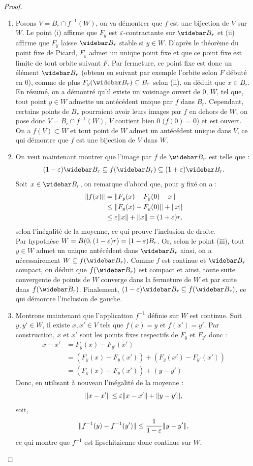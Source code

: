 \begin{proof}
\begin{enumerate}[label=(\roman*)]
\item 
Posons $V = B_r \cap f^{-1}(W)$, on va démontrer que $f$ est une bijection de $V$ sur $W$.
Le point (i) affirme que $F_y$ est $\varepsilon$-contractante sur $\Bfr$ et (ii) affirme que $F_y$ laisse $\Bfr$ stable si $y \in W$.
D'après le théorème du point fixe de Picard, $F_y$ admet un unique point fixe et que ce point fixe est limite de tout orbite suivant $F$.
Par fermeture, ce point fixe est donc un élément $\Bfr$ (obtenu en suivant par exemple l'orbite selon $F$ débuté en 0), 
comme de plus $F_y(\Bfr) \subset B_r$ selon (ii), on déduit que $x \in B_r$.
En résumé, on a démontré qu'il existe un voisinage ouvert de 0, $W$, tel que, tout point $y \in W$ admette un antécédent unique par $f$
dans $B_r$. 
Cependant, certains points de $B_r$ pourraient avoir leurs images par $f$ en dehors de $W$, on pose donc $V = B_r \cap f^{-1}(W)$,
$V$ contient bien 0 ($f(0)=0$) et est ouvert. On a $f(V) \subset W$ et tout point de $W$ admet un antécédent unique dans $V$, 
ce qui démontre que $f$ est une bijection de $V$ dans $W$.

\item
On veut maintenant montrer que l'image par $f$ de $\Bfr$ est telle que :
\[ (1-\veps)\Bfr \subset f(\Bfr) \subset (1+\veps)\Bfr . \]
Soit $x \in \Bfr$, on remarque d'abord que, pour $y$ fixé on a :
\begin{align*}
\lVert f(x)\rVert & = \lVert F_y(x) - F_y(0) - x\rVert \\
& \leq \lVert F_y(x) - F_y(0)\rVert + \lVert x\rVert \\
& \leq \varepsilon \lVert x\rVert + \lVert x\rVert = (1+\varepsilon) r ,
\end{align*}
selon l'inégalité de la moyenne, ce qui prouve l'inclusion de droite. \\
Par hypothèse $W = B(0, (1-\varepsilon)r) = (1-\varepsilon)B_r$. Or, selon le point (iii), tout $y \in W$ admet un unique antécédent dans $\Bfr$
ainsi, on a nécessairement $W \subset f(\Bfr)$. Comme $f$ est continue et $\Bfr$ compact, on déduit que $f(\Bfr)$ est compact
et ainsi, toute suite convergente de points de $W$ converge dans la fermeture de $W$ et par suite dans $f(\Bfr)$.
Finalement, $(1-\veps)\Bfr \subset f(\Bfr)$, ce qui démontre l'inclusion de gauche.

\item
Montrons maintenant que l'application $f^{-1}$ définie sur $W$ est continue. Soit $y, y' \in W$, il existe $x, x' \in V$ tels que
$f(x)=y$ et $f(x')=y'$. Par construction, $x$ et $x'$ sont les points fixes respectifs de $F_y$ et $F_{y'}$ donc :
\begin{align*}
x-x' & = F_y(x) - F_{y'}(x') \\
& = (F_y(x) - F_y(x')) + (F_y(x')-F_{y'}(x')) \\
& = (F_y(x) - F_y(x')) + (y-y')
\end{align*}
Donc, en utilisant à nouveau l'inégalité de la moyenne :
\[ \lVert x-x'\rVert \leq \varepsilon \lVert x-x'\rVert + \lVert y-y'\rVert , \]
soit,
\[ \lVert f^{-1}(y) - f^{-1}(y')\rVert \leq \dfrac1{1-\varepsilon} \lVert y-y'\rVert , \]
ce qui montre que $f^{-1}$ est lipschitzienne donc continue sur $W$.


\end{enumerate}
\end{proof}
